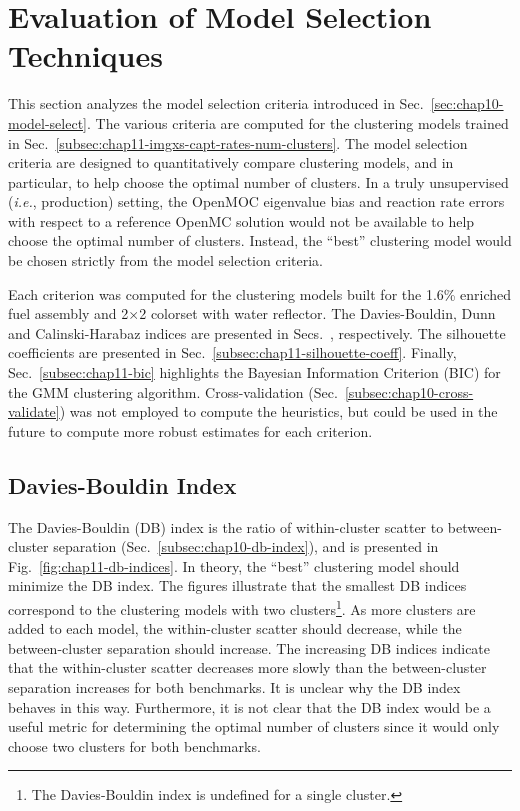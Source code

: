 \clearpage


\section{Evaluation of Model Selection Techniques}
\label{sec:chap11-model-select}

This section analyzes the model selection criteria introduced in Sec.~\ref{sec:chap10-model-select}. The various criteria are computed for the clustering models trained in Sec.~\ref{subsec:chap11-imgxs-capt-rates-num-clusters}. The model selection criteria are designed to quantitatively compare clustering models, and in particular, to help choose the optimal number of clusters. In a truly unsupervised (\textit{i.e.}, production) setting, the OpenMOC eigenvalue bias and reaction rate errors with respect to a reference OpenMC solution would not be available to help choose the optimal number of clusters. Instead, the ``best'' clustering model would be chosen strictly from the model selection criteria.

Each criterion was computed for the clustering models built for the 1.6\% enriched fuel assembly and 2$\times$2 colorset with water reflector. The Davies-Bouldin, Dunn and Calinski-Harabaz indices are presented in Secs.~, respectively. The silhouette coefficients are presented in Sec.~\ref{subsec:chap11-silhouette-coeff}. Finally, Sec.~\ref{subsec:chap11-bic} highlights the Bayesian Information Criterion (BIC) for the \ac{GMM} clustering algorithm. Cross-validation (Sec.~\ref{subsec:chap10-cross-validate}) was not employed to compute the heuristics, but could be used in the future to compute more robust estimates for each criterion.	


\subsection{Davies-Bouldin Index}
\label{subsec:chap11-db-index}

The Davies-Bouldin (DB) index is the ratio of within-cluster scatter to between-cluster separation (Sec.~\ref{subsec:chap10-db-index}), and is presented in Fig.~\ref{fig:chap11-db-indices}. In theory, the ``best'' clustering model should minimize the DB index. The figures illustrate that the smallest DB indices correspond to the clustering models with two clusters\footnote{The Davies-Bouldin index is undefined for a single cluster.}. As more clusters are added to each model, the within-cluster scatter should decrease, while the between-cluster separation should increase. The increasing DB indices indicate that the within-cluster scatter decreases more slowly than the between-cluster separation increases for both benchmarks. It is unclear why the DB index behaves in this way. Furthermore, it is not clear that the DB index would be a useful metric for determining the optimal number of clusters since it would only choose two clusters for both benchmarks.

